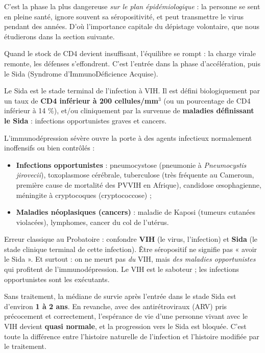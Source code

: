 \documentclass[11pt]{article}
\newcommand{\cle}[1]{{\popxbold\color{popdark}#1}}
\newcounter{popsec}
\newcounter{popsub}
\newcommand{\courssub}[1]{%
  \stepcounter{popsub}%
  \par\vspace{9pt}\noindent{\popxbold\fontsize{11.5}{13}\selectfont\color{popink}{\color{poporange}\thepopsec.\thepopsub}\hspace{6pt}#1}\par\nopagebreak\vspace{4pt}
}
\begin{document}
C'est la phase la plus dangereuse \emph{sur le plan épidémiologique} : la personne se sent en pleine santé, ignore souvent sa séropositivité, et peut transmettre le virus pendant des années. D'où l'importance capitale du dépistage volontaire, que nous étudierons dans la section suivante.

\courssub{Phase 3 : le Sida déclaré}

Quand le stock de CD4 devient insuffisant, l'équilibre se rompt : la charge virale remonte, les défenses s'effondrent. C'est l'entrée dans la phase d'accélération, puis le \cle{Sida} (Syndrome d'ImmunoDéficience Acquise).

\begin{definition}[Sida]
Le \cle{Sida} est le stade terminal de l'infection à VIH. Il est défini biologiquement par un taux de \textbf{CD4 inférieur à 200 cellules/mm$^3$} (ou un pourcentage de CD4 inférieur à 14 \%), et/ou cliniquement par la survenue de \textbf{maladies définissant le Sida} : infections opportunistes graves et cancers.
\end{definition}

L'immunodépression sévère ouvre la porte à des agents infectieux normalement inoffensifs ou bien contrôlés :

\begin{itemize}
\item \textbf{Infections opportunistes} : pneumocystose (pneumonie à \emph{Pneumocystis jirovecii}), toxoplasmose cérébrale, tuberculose (très fréquente au Cameroun, première cause de mortalité des PVVIH en Afrique), candidose œsophagienne, méningite à cryptocoques (cryptococcose) ;
\item \textbf{Maladies néoplasiques (cancers)} : maladie de Kaposi (tumeurs cutanées violacées), lymphomes, cancer du col de l'utérus.
\end{itemize}

\begin{attention}
Erreur classique au Probatoire : confondre \textbf{VIH} (le virus, l'infection) et \textbf{Sida} (le stade clinique terminal de cette infection). Être séropositif ne signifie pas « avoir le Sida ». Et surtout : on ne meurt pas \emph{du} VIH, mais \emph{des maladies opportunistes} qui profitent de l'immunodépression. Le VIH est le saboteur ; les infections opportunistes sont les exécutants.
\end{attention}

\begin{propriete}
Sans traitement, la médiane de survie après l'entrée dans le stade Sida est d'environ \textbf{1 à 2 ans}. En revanche, avec des antirétroviraux (ARV) pris précocement et correctement, l'espérance de vie d'une personne vivant avec le VIH devient \textbf{quasi normale}, et la progression vers le Sida est bloquée. C'est toute la différence entre l'histoire naturelle de l'infection et l'histoire modifiée par le traitement.
\end{propriete}
\end{document}
